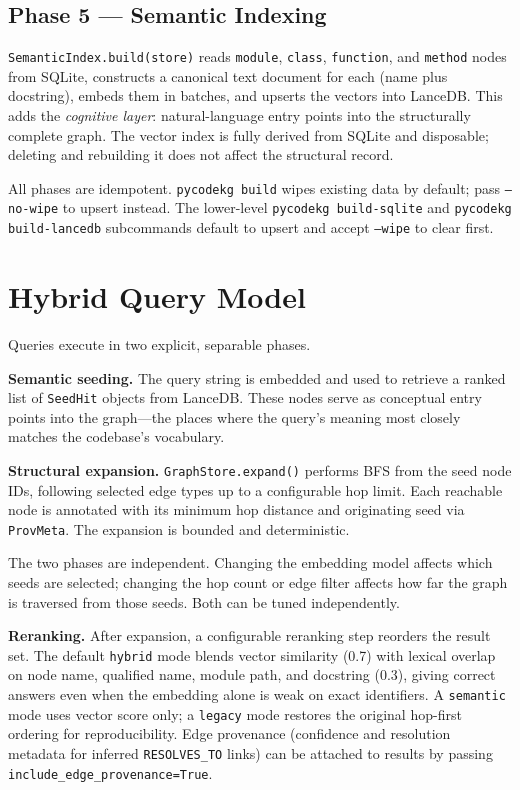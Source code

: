 \documentclass[10pt]{article}
\begin{document}
\subsection{Phase 5 --- Semantic Indexing}

\texttt{SemanticIndex.build(store)} reads \texttt{module}, \texttt{class},
\texttt{function}, and \texttt{method} nodes from SQLite, constructs a
canonical text document for each (name plus docstring), embeds them in
batches, and upserts the vectors into LanceDB. This adds the
\emph{cognitive layer}: natural-language entry points into the structurally
complete graph. The vector index is fully derived from SQLite and disposable;
deleting and rebuilding it does not affect the structural record.

All phases are idempotent. \texttt{pycodekg build} wipes existing data by
default; pass \texttt{--no-wipe} to upsert instead. The lower-level
\texttt{pycodekg build-sqlite} and \texttt{pycodekg build-lancedb}
subcommands default to upsert and accept \texttt{--wipe} to clear first.

\section{Hybrid Query Model}

Queries execute in two explicit, separable phases.

\textbf{Semantic seeding.} The query string is embedded and used to retrieve a
ranked list of \texttt{SeedHit} objects from LanceDB. These nodes serve as
conceptual entry points into the graph---the places where the query's meaning
most closely matches the codebase's vocabulary.

\textbf{Structural expansion.} \texttt{GraphStore.expand()} performs BFS from the
seed node IDs, following selected edge types up to a configurable hop limit. Each
reachable node is annotated with its minimum hop distance and originating seed via
\texttt{ProvMeta}. The expansion is bounded and deterministic.

The two phases are independent. Changing the embedding model affects which seeds
are selected; changing the hop count or edge filter affects how far the graph is
traversed from those seeds. Both can be tuned independently.

\textbf{Reranking.} After expansion, a configurable reranking step reorders the
result set.  The default \texttt{hybrid} mode blends vector similarity (0.7) with
lexical overlap on node name, qualified name, module path, and docstring (0.3),
giving correct answers even when the embedding alone is weak on exact identifiers.
A \texttt{semantic} mode uses vector score only; a \texttt{legacy} mode restores
the original hop-first ordering for reproducibility.  Edge provenance (confidence
and resolution metadata for inferred \texttt{RESOLVES\_TO} links) can be attached
to results by passing \texttt{include\_edge\_provenance=True}.
\end{document}
